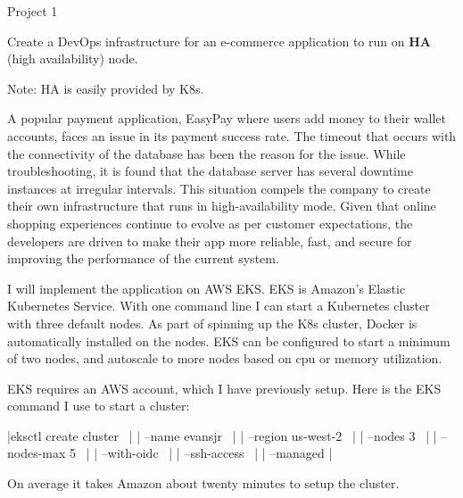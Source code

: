 %





%


\twelvepoint


\ms

Project 1


\ms

Create a DevOps infrastructure for an e-commerce application to run on {\bf HA\/} (high availability) node.

Note: HA is easily provided by K8s.

\bs


\ms

A popular payment application, EasyPay where users add
money to their wallet accounts, faces an issue in its
payment success rate. The timeout that occurs with the
connectivity of the database has been the reason for the issue.
While troubleshooting, it is found that the database server
has several downtime instances at irregular intervals. This
situation compels the company to create their own infrastructure
that runs in high-availability mode.  Given that online shopping
experiences continue to evolve as per customer expectations,
the developers are driven to make their app more reliable, fast,
and secure for improving the performance of the current system.


\bs


I will implement the application on AWS EKS.  EKS is Amazon's Elastic Kubernetes Service. 
With one command line I can start a Kubernetes cluster with three default nodes.
As part of spinning up the K8s cluster, Docker is automatically installed on the nodes.
EKS can be configured to start a minimum of two nodes, and autoscale to more nodes based on cpu or memory utilization.

EKS requires an AWS account, which I have previously setup.  Here is the EKS command I use to start a cluster:

\beginlines
|eksctl create cluster \ |
|    --name evansjr \  |
|     --region us-west-2 \ |
|     --nodes 3 \ |
|     --nodes-max 5 \ |
|     --with-oidc \ |
|     --ssh-access \ |
|     --managed |
\endlines

\noindent On average it takes Amazon about twenty minutes to setup the cluster.

